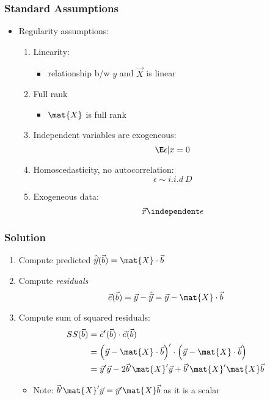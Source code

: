 \documentclass[mathserif, xcolor=table, svgnames]{beamer}
\begin{document}
\begin{frame}
  \frametitle{Standard Assumptions}
  \begin{itemize}
  \item Regularity assumptions:
    \begin{enumerate}
    \item Linearity: 
      \begin{itemize}
      \item relationship b/w $y$ and $\vec{X}$ is linear
      \end{itemize}
    \item Full rank
      \begin{itemize}
      \item $\mat{X}$ is full rank
      \end{itemize}
    \item Independent variables are exogeneous:
      \begin{equation*}
        \E \epsilon|x = 0
      \end{equation*}
      \pause
    \item Homoscedasticity, no autocorrelation:
      \begin{equation*}
        \epsilon \sim i.i.d \ D
      \end{equation*}
    \item Exogeneous data:
      \begin{equation*}
        \vec{x} \independent \epsilon
      \end{equation*}
    \end{enumerate}
  \end{itemize}
\end{frame}

\begin{frame}
  \frametitle{Solution}
  \begin{enumerate}
  \item Compute predicted $\hat{\vec{y}}(\vec{b}) = \mat{X} \cdot
    \vec{b}$
  \item Compute \emph{residuals}
    \begin{equation*}
      \vec{e}(\vec{b}) = 
      \vec{y} - \hat{\vec{y}} =
      \vec{y} - \mat{X} \cdot \vec{b}
    \end{equation*}
  \item Compute sum of squared residuals:
    \begin{align*}
      SS(\vec{b}) &= \vec{e}'(\vec{b}) \cdot \vec{e}(\vec{b}) \\
      &= 
        \left( \vec{y} - \mat{X} \cdot \vec{b} \right)' \cdot
        \left( \vec{y} - \mat{X} \cdot \vec{b} \right) \\
      &= \vec{y}'\vec{y} - 
        2 \vec{b}' \mat{X}' \vec{y} +
        \vec{b}' \mat{X}' \mat{X} \vec{b}
    \end{align*}
    \begin{itemize}
    \item Note: $\vec{b}' \mat{X}' \vec{y} = \vec{y}' \mat{X} \vec{b}$ as it is a scalar
    \end{itemize}
  \end{enumerate}
\end{frame}

{

}
\end{document}
